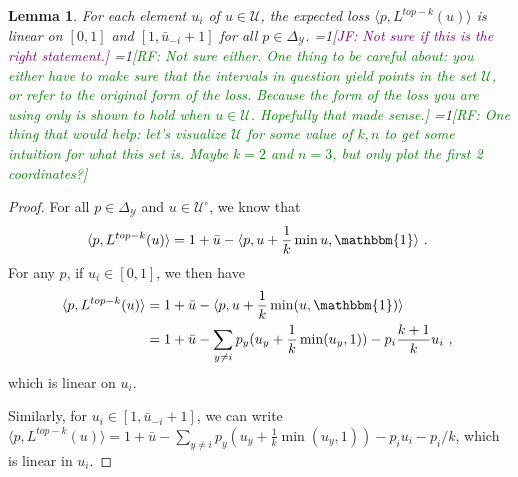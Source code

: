 \documentclass[12pt]{article}
\newcommand{\Comments}{1}
\newcommand{\mynote}[2]{\ifnum\Comments=1\textcolor{#1}{#2}\fi}
\newcommand{\raf}[1]{\mynote{green}{[RF: #1]}}
\newcommand{\jessie}[1]{\mynote{purple}{[JF: #1]}}
\newcommand{\simplex}{\Delta_\Y}
\newcommand{\U}{\mathcal{U}}
\newcommand{\Y}{\mathcal{Y}}
\newcommand{\inprod}[2]{\langle #1, #2 \rangle}%
\newcommand{\ones}{\mathbbm{1}}
\newtheorem{lemma}{Lemma}
\begin{document}
\begin{lemma}\label{lem:linear-pieces}
	For each element $u_i$ of $u \in \U$, the expected loss $\inprod{p}{L^{top-k}(u)}$ is linear on $[0,1]$ and $[1, \bar u_{-i} + 1]$ for all $p \in \simplex$.
	\jessie{Not sure if this is the right statement.}
    \raf{Not sure either.  One thing to be careful about: you either have to make sure that the intervals in question yield points in the set $\U$, or refer to the original form of the loss.  Because the form of the loss you are using only is shown to hold when $u\in\U$.  Hopefully that made sense.}
    \raf{One thing that would help: let's visualize $\U$ for some value of $k,n$ to get some intuition for what this set is.  Maybe $k=2$ and $n=3$, but only plot the first 2 coordinates?}
\end{lemma}
\begin{proof}
	For all $p \in \simplex$ and $u \in \U^\circ$, we know that 
	\begin{equation}
	\inprod{p}{L^{top-k}(u)} = 1 + \bar u - \inprod{p}{u + \frac 1 k \min{u,\ones}}~.~
	\end{equation}
	For any $p$, if $u_i \in [0,1]$, we then have 
	\begin{align*}
	\inprod{p}{L^{top-k}(u)} &= 1 + \bar u - \inprod{p}{u + \frac 1 k \min(u,\ones)}\\
	 &= 1 + \bar u - \sum_{y \neq i}p_y (u_y + \frac 1 k \min(u_y, 1)) - p_i \frac {k+1} k u_i~,~
	\end{align*}
	which is linear on $u_i$.
	
	Similarly, for $u_i \in [1, \bar u_{-i} + 1]$, we can write $\inprod{p}{L^{top-k}(u)} = 1 + \bar u - \sum_{y \neq i}p_y (u_y + \frac 1 k \min(u_y, 1)) - p_i u_i - p_i/k$, which is linear in $u_i$.
\end{proof}
\end{document}
